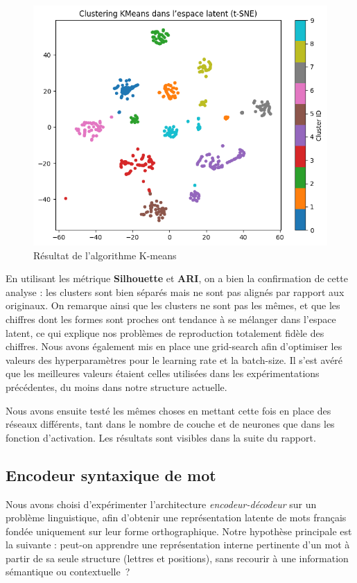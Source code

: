 \documentclass{article}
\begin{document}
\begin{figure}[H]
    \centering
    \includegraphics[width=0.8\linewidth]{Images/k-means.png}
    \caption{Résultat de l'algorithme K-means}
    \label{fig:k-means}
\end{figure}
En utilisant les métrique \textbf{Silhouette} et \textbf{ARI}, on a bien la confirmation de cette analyse : les clusters sont bien séparés mais ne sont pas alignés par rapport aux originaux.
On remarque ainsi que les clusters ne sont pas les mêmes, et que les chiffres dont les formes sont proches ont tendance à se mélanger dans l'espace latent, ce qui explique nos problèmes de reproduction totalement fidèle des chiffres.
Nous avons également mis en place une grid-search afin d'optimiser les valeurs des hyperparamètres pour le learning rate et la batch-size. Il s'est avéré que les meilleures valeurs étaient celles utilisées dans les expérimentations précédentes, du moins dans notre structure actuelle.

Nous avons ensuite testé les mêmes choses en mettant cette fois en place des réseaux différents, tant dans le nombre de couche et de neurones que dans les fonction d'activation. Les résultats sont visibles dans la suite du rapport.

\subsection{Encodeur syntaxique de mot}

Nous avons choisi d’expérimenter l'architecture \textit{encodeur-décodeur} sur un problème linguistique, afin d’obtenir une représentation latente de mots français fondée uniquement sur leur forme orthographique. 
Notre hypothèse principale est la suivante : peut-on apprendre une représentation interne pertinente d’un mot à partir de sa seule structure (lettres et positions), sans recourir à une information sémantique ou contextuelle~?
\end{document}
